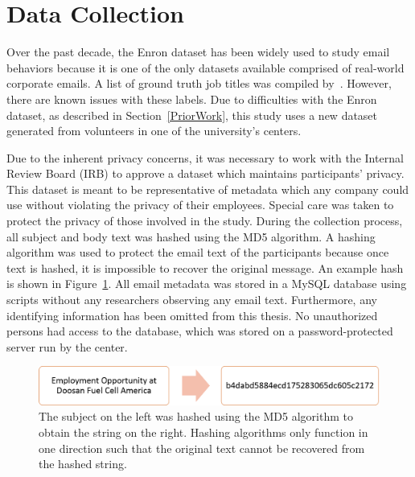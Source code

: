 \documentclass[12pt]{report}
\begin{document}
\section{Data Collection}
Over the past decade, the Enron dataset has been widely used to study email behaviors because it is one of the only datasets available comprised of real-world corporate emails.
A list of ground truth job titles was compiled by~\cite{shetty_status_2004}.  However, there are known issues with these labels.
Due to difficulties with the Enron dataset, as described in Section~\ref{PriorWork}, this study uses a new dataset generated from volunteers in one of the university's centers.

Due to the inherent privacy concerns, it was necessary to work with the Internal Review Board (IRB) to approve a dataset which maintains participants' privacy.
This dataset is meant to be representative of metadata which any company could use without violating the privacy of their employees.
Special care was taken to protect the privacy of those involved in the study.
During the collection process, all subject and body text was hashed using the MD5 algorithm.
A hashing algorithm was used to protect the email text of the participants because once text is hashed, it is impossible to recover the original message.
An example hash is shown in Figure~\ref{fig:hash_ex}.
All email metadata was stored in a MySQL database using scripts without any researchers observing any email text.
Furthermore, any identifying information has been omitted from this thesis.
No unauthorized persons had access to the database, which was stored on a password-protected server run by the center.
\begin{figure}[t]
	\centering
	\includegraphics[width=\columnwidth,trim={0mm 0mm 0mm 0mm},clip]{hash_ex}
	\caption[Example subject hash]{The subject on the left was hashed using the MD5 algorithm to obtain the string on the right.  Hashing algorithms only function in one direction such that the original text cannot be recovered from the hashed string.}
	\label{fig:hash_ex}
\end{figure}
\end{document}
